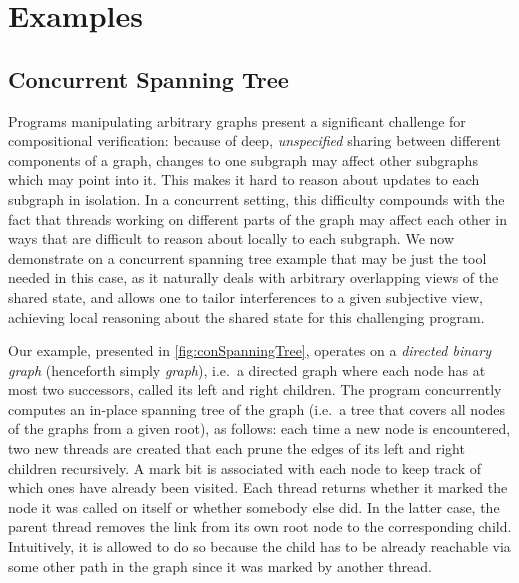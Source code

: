 \section{Examples}\label{sec:examples}


\subsection{Concurrent Spanning Tree}\label{subsec:CST-example}

Programs manipulating arbitrary graphs present a
significant challenge for compositional verification: because of deep,
\emph{unspecified} sharing between different components of a graph,
changes to one subgraph may affect other subgraphs which may point
into it. This makes it hard to reason about updates to each subgraph
in isolation. In a concurrent setting, this difficulty compounds with
the fact that threads working on different parts of the graph may
affect each other in ways that are difficult to reason about locally
to each subgraph. We now demonstrate on a concurrent spanning tree
example that \colosl may be just the tool needed in this case, as it
naturally deals with arbitrary overlapping views of the shared state,
and allows one to tailor interferences to a given subjective view,
achieving local reasoning about the shared state for this challenging program.

Our example, presented in \fig\ref{fig:conSpanningTree}, operates on a
\emph{directed binary graph} (henceforth simply \emph{graph}),
i.e.\ a directed graph where each node has at most two
successors, called its left and right children. The program concurrently computes an
in-place spanning tree of the graph (i.e.\ a tree that covers
all nodes of the graphs from a given root), as follows:
each time a new node is encountered, two new threads are created that
each prune the edges of its left and right children recursively. A
mark bit is associated with each node to keep track of which ones have
already been visited. Each thread returns whether it marked the node
it was called on itself or whether somebody else did. In the latter case,
the parent thread removes the link from its own root node to the
corresponding child. Intuitively, it is allowed to do so because the child has to be
already reachable via some other path in the graph since it was marked by another thread.


